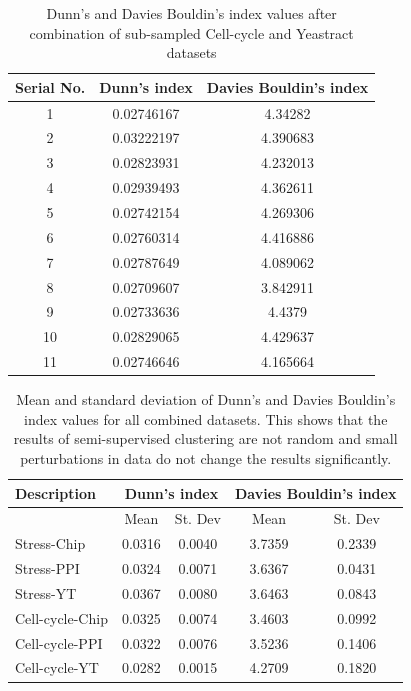 \begin{table}[p]
\centering
\begin{tabular}{|c|c|c|}
\hline
Serial No. & Dunn's index  & Davies Bouldin's index\\
\hline
1 & 0.02746167 & 4.34282 \\
2 & 0.03222197 & 4.390683 \\
3 & 0.02823931 &  4.232013 \\
4 & 0.02939493 &  4.362611 \\
5 & 0.02742154 & 4.269306 \\
6 & 0.02760314 & 4.416886 \\
7 & 0.02787649 & 4.089062 \\
8 & 0.02709607 & 3.842911 \\
9 & 0.02733636 & 4.4379 \\
10 & 0.02829065 & 4.429637 \\
11 & 0.02746646 &  4.165664 \\
\hline 
\end{tabular}
\caption{Dunn's and Davies Bouldin's index values after combination of sub-sampled Cell-cycle and Yeastract datasets}
\label{tab:ccycle_yt_perturbed}
\end{table}

\begin{table}
\centering
\begin{tabular}{|l|c|c|c|c|}
\hline
Description & \multicolumn{2}{|c|}{Dunn's index}  & \multicolumn{2}{|c|}{Davies Bouldin's index}\\
\hline
 & Mean & St. Dev & Mean & St. Dev\\
\hline
Stress-Chip & 0.0316 & 0.0040 & 3.7359 & 0.2339 \\
Stress-PPI & 0.0324 & 0.0071 & 3.6367 & 0.0431 \\
Stress-YT & 0.0367 & 0.0080 & 3.6463 & 0.0843 \\

\hline
Cell-cycle-Chip & 0.0325 & 0.0074 & 3.4603 & 0.0992 \\
Cell-cycle-PPI & 0.0322 & 0.0076 & 3.5236 & 0.1406 \\
Cell-cycle-YT & 0.0282 & 0.0015 & 4.2709 & 0.1820 \\
\hline 
\end{tabular}
\caption[Mean and standard deviation of Dunn's and Davies Bouldin's index values for all combined datasets.]{Mean and standard deviation of Dunn's and Davies Bouldin's index values for all combined datasets. This shows that the results of 
semi-supervised clustering are not random and small perturbations in data do not change the results significantly.}
\label{tab:mean_stdev_combined_perturbed}
\end{table}

